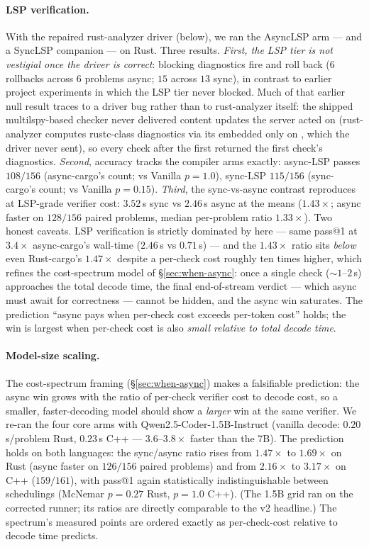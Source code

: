 \paragraph{LSP verification.} With the repaired rust-analyzer
driver (below), we ran the AsyncLSP arm --- and a SyncLSP
companion --- on Rust. Three results. \emph{First, the LSP tier is
not vestigial once the driver is correct}: blocking diagnostics
fire and roll back ($6$ rollbacks across $6$ problems async;
$15$ across $13$ sync), in contrast to earlier project experiments
in which the LSP tier never blocked. Much of that earlier null
result traces to a driver bug rather than to rust-analyzer itself:
the shipped multilspy-based checker never delivered content
updates the server acted on (rust-analyzer computes rustc-class
diagnostics via its embedded  only on
, which the driver never sent), so every check after
the first returned the first check's diagnostics. \emph{Second},
accuracy tracks the compiler arms exactly: async-LSP passes
$108/156$ (async-cargo's count; vs
\textsf{Vanilla} $p\!=\!1.0$),
sync-LSP $115/156$ (sync-cargo's count; vs \textsf{Vanilla}
$p\!=\!0.15$).
\emph{Third}, the sync-vs-async contrast reproduces at LSP-grade
verifier cost: $3.52$\,s sync vs $2.46$\,s async at the means
($1.43\times$; async faster on $128/156$ paired problems, median
per-problem ratio $1.33\times$). Two honest caveats. LSP
verification is strictly dominated by  here ---
same pass@1 at $3.4\times$ async-cargo's wall-time
($2.46$\,s vs $0.71$\,s) --- and the $1.43\times$ ratio sits
\emph{below} even Rust-cargo's $1.47\times$ despite a per-check
cost roughly ten times higher, which refines the cost-spectrum
model of
\S\ref{sec:when-async}: once a single check ($\sim$$1$--$2$\,s)
approaches the total decode time, the final end-of-stream verdict
--- which async must await for correctness --- cannot be hidden,
and the async win saturates. The prediction ``async pays when
per-check cost exceeds per-token cost'' holds; the win is largest
when per-check cost is also \emph{small relative to total decode
time}.

\paragraph{Model-size scaling.} The cost-spectrum framing
(\S\ref{sec:when-async}) makes a falsifiable prediction: the async
win grows with the ratio of per-check verifier cost to decode
cost, so a smaller, faster-decoding model should show a
\emph{larger} win at the same verifier. We re-ran the four core
arms with Qwen2.5-Coder-1.5B-Instruct (vanilla decode:
$0.20$\,s/problem Rust, $0.23$\,s C++ --- $3.6$--$3.8\times$
faster than
the 7B). The prediction holds on both languages: the sync/async
ratio rises from $1.47\times$ to $1.69\times$ on Rust (async
faster on $126/156$ paired problems) and from $2.16\times$ to
$3.17\times$ on C++ ($159/161$), with pass@1 again statistically
indistinguishable between schedulings (McNemar $p\!=\!0.27$ Rust,
$p\!=\!1.0$ C++). (The 1.5B grid ran on the corrected runner; its
ratios are directly comparable to the v2 headline.) The spectrum's
measured points are ordered exactly as per-check-cost relative
to decode time predicts.

